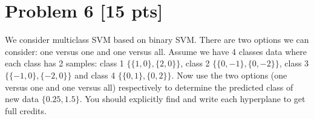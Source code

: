 \documentclass[11pt]{article}
\begin{document}
\newpage
\section*{Problem 6 [15 pts]}
We consider multiclass SVM based on binary SVM. There are two options we can consider: one versus one and one versus all. Assume we have 4 classes data where each class has 2 samples: class 1 $\{\{1,0\},\{2,0\}\}$, class 2 $\{\{0,-1\},\{0,-2\}\}$, class 3 $\{\{-1,0\},\{-2,0\}\}$ and class 4 $\{\{0,1\},\{0,2\}\}$. Now use the two options (one versus one and one versus all) respectively to determine the predicted class of new data $\{0.25,1.5\}$. You should explicitly find and write each hyperplane to get full credits.
\end{document}
